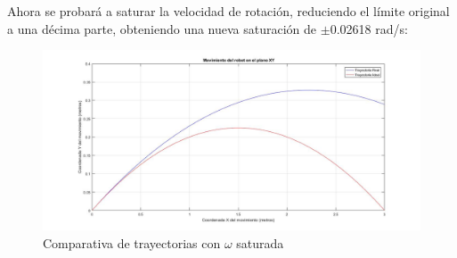 \documentclass[a4paper,twoside]{article}
\begin{document}
Ahora se probará a saturar la velocidad de rotación, reduciendo el límite original a una décima parte, obteniendo una nueva saturación de $\pm$0.02618 rad/s:
\begin{figure}[h!]
	\centering
	\includegraphics[width=1\textwidth]{parab_6}
	\caption{Comparativa de trayectorias con $\omega$ saturada}
\end{figure}
\end{document}
